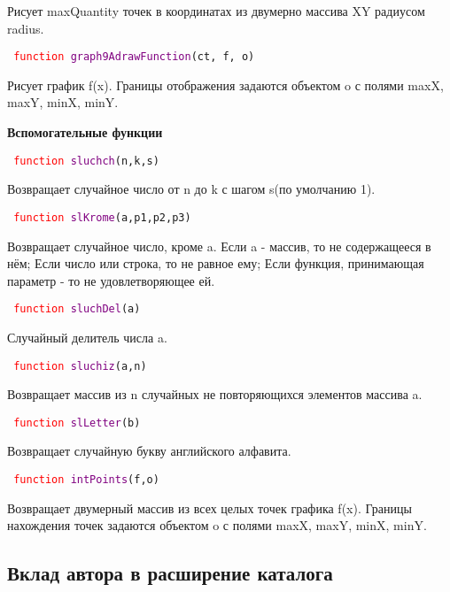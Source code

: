 Рисует maxQuantity точек в координатах из двумерно массива XY радиусом radius.

\texttt{
	\textcolor{Red}{function} \textcolor{Purple}{graph9AdrawFunction}(ct, f, o)
}

Рисует график f(x). Границы отображения задаются объектом o с полями maxX, maxY, minX, minY.

\textbf{Вспомогательные функции}

\texttt{
	\textcolor{Red}{function} \textcolor{Purple}{sluchch}(n,k,s)
}

Возвращает случайное число от n до k с шагом s(по умолчанию 1).

\texttt{
	\textcolor{Red}{function} \textcolor{Purple}{slKrome}(a,p1,p2,p3)
}

Возвращает случайное число, кроме a. Если a \-- массив, то не содержащееся в нём; Если число или строка, то не равное ему; Если функция, принимающая параметр - то не удовлетворяющее ей.

\texttt{
	\textcolor{Red}{function} \textcolor{Purple}{sluchDel}(a)
}

Случайный делитель числа a.

\texttt{
	\textcolor{Red}{function} \textcolor{Purple}{sluchiz}(a,n)
}

Возвращает массив из n случайных не повторяющихся элементов массива a.

\texttt{
	\textcolor{Red}{function} \textcolor{Purple}{slLetter}(b)
}

Возвращает случайную букву английского алфавита.

\texttt{
	\textcolor{Red}{function} \textcolor{Purple}{intPoints}(f,o)
}

Возвращает двумерный массив из всех целых точек графика f(x).  Границы нахождения точек задаются объектом o с полями maxX, maxY, minX, minY.

\subsection{Вклад автора в расширение каталога}